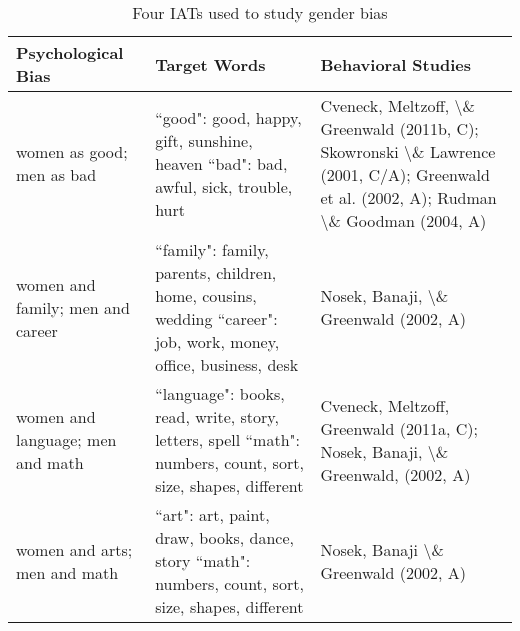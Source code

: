 \documentclass[
  english,
  ,man,floatsintext]{apa6}
\begin{document}
\begin{longtabu} to 
\caption{\label{tab:iattablex}Four IATs used to study gender bias}\\
\toprule
Psychological Bias & Target Words & Behavioral Studies\\
\midrule
\bgroup\fontsize{8}{10}\selectfont women as good;
men as bad\egroup{} & \bgroup\fontsize{8}{10}\selectfont ``good": good, happy, gift,  sunshine, heaven
``bad": bad, awful, sick, trouble, hurt\egroup{} & \bgroup\fontsize{8}{10}\selectfont Cveneck, Meltzoff, \textbackslash{}\& Greenwald (2011b, C); Skowronski \textbackslash{}\& Lawrence (2001, C/A); Greenwald et al. (2002, A); Rudman \textbackslash{}\& Goodman (2004, A)\egroup{}\\
\bgroup\fontsize{8}{10}\selectfont women and family;
men and career\egroup{} & \bgroup\fontsize{8}{10}\selectfont ``family": family, parents, children, home, cousins, wedding
``career": job,  work,  money, office, business, desk\egroup{} & \bgroup\fontsize{8}{10}\selectfont Nosek, Banaji,   \textbackslash{}\& Greenwald (2002, A)\egroup{}\\
\bgroup\fontsize{8}{10}\selectfont women and language;
men and math\egroup{} & \bgroup\fontsize{8}{10}\selectfont ``language": books, read, write, story, letters, spell
``math": numbers, count,  sort,  size, shapes, different\egroup{} & \bgroup\fontsize{8}{10}\selectfont Cveneck, Meltzoff, Greenwald (2011a, C); Nosek, Banaji,  \textbackslash{}\& Greenwald, (2002, A)\egroup{}\\
\bgroup\fontsize{8}{10}\selectfont women and arts;
 men and math\egroup{} & \bgroup\fontsize{8}{10}\selectfont ``art": art, paint, draw, books, dance, story
``math": numbers, count,  sort,  size, shapes, different\egroup{} & \bgroup\fontsize{8}{10}\selectfont  Nosek, Banaji \textbackslash{}\& Greenwald (2002, A)\egroup{}\\
\bottomrule
\end{longtabu}
\end{document}
